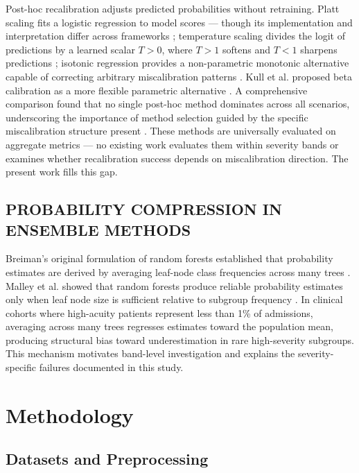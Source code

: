 \documentclass{ieeeaccess}
\begin{document}
Post-hoc recalibration adjusts predicted probabilities without retraining. Platt scaling fits a logistic regression to model scores — though its implementation and interpretation differ across frameworks \cite{b16, b29}; temperature scaling divides the logit of predictions by a learned scalar $T>0$, where $T>1$ softens and $T<1$ sharpens predictions \cite{b4}; isotonic regression provides a non-parametric monotonic alternative capable of correcting arbitrary miscalibration patterns \cite{b17}. Kull et al. proposed beta calibration as a more flexible parametric alternative \cite{b9}. A comprehensive comparison found that no single post-hoc method dominates across all scenarios, underscoring the importance of method selection guided by the specific miscalibration structure present \cite{b33}. These methods are universally evaluated on aggregate metrics — no existing work evaluates them within severity bands or examines whether recalibration success depends on miscalibration direction. The present work fills this gap.

\subsection{PROBABILITY COMPRESSION IN ENSEMBLE METHODS}

Breiman's original formulation of random forests established that probability estimates are derived by averaging leaf-node class frequencies across many trees \cite{b27}. Malley et al. showed that random forests produce reliable probability estimates only when leaf node size is sufficient relative to subgroup frequency \cite{b7}. In clinical cohorts where high-acuity patients represent less than 1\% of admissions, averaging across many trees regresses estimates toward the population mean, producing structural bias toward underestimation in rare high-severity subgroups. This mechanism motivates band-level investigation and explains the severity-specific failures documented in this study.

\section{Methodology}
\label{sec:methodology}

\subsection{Datasets and Preprocessing}
\end{document}

